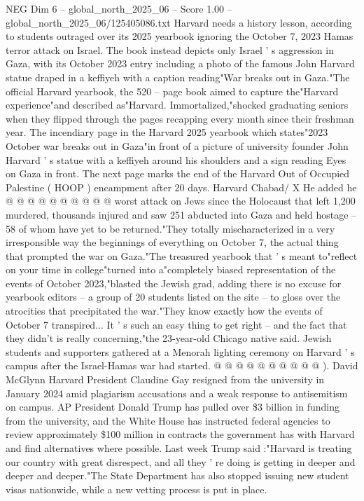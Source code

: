 \begin{textsample}{NEG Dim 6 – global\_north\_2025\_06 – Score 1.00 – global\_north\_2025\_06/125405086.txt}  \label{ex:f6_neg_424}
Harvard needs a history lesson, according to students outraged over its 2025 yearbook ignoring the October 7, 2023 Hamas terror attack on Israel.
The book instead depicts only Israel ' s aggression in Gaza, with its October 2023 entry including a photo of the famous John Harvard statue draped in a keffiyeh with a caption reading"War breaks out in Gaza."The official Harvard yearbook, the 520 -- page book aimed to capture the"Harvard experience"and described as"Harvard.
Immortalized,"shocked graduating seniors when they flipped through the pages recapping every month since their freshman year.
The incendiary page in the Harvard 2025 yearbook which states"2023 October war breaks out in Gaza"in front of a picture of university founder John Harvard ' s statue with a keffiyeh around his shoulders and a sign reading Eyes on Gaza in front.
The next page marks the end of the Harvard Out of Occupied Palestine ( HOOP ) encampment after 20 days.
Harvard Chabad/ X He added he @ @ @ @ @ @ @ @ @ @ worst attack on Jews since the Holocaust that left 1,200 murdered, thousands injured and saw 251 abducted into Gaza and held hostage -- 58 of whom have yet to be returned."They totally mischaracterized in a very irresponsible way the beginnings of everything on October 7, the actual thing that prompted the war on Gaza."The treasured yearbook that ' s meant to"reflect on your time in college"turned into a"completely biased representation of the events of October 2023,"blasted the Jewish grad, adding there is no excuse for yearbook editors -- a group of 20 students listed on the site -- to gloss over the atrocities that precipitated the war."They know exactly how the events of October 7 transpired...
It ' s such an easy thing to get right -- and the fact that they didn't is really concerning,"the 23-year-old Chicago native said.
Jewish students and supporters gathered at a Menorah lighting ceremony on Harvard ' s campus after the Israel-Hamas war had started. @ @ @ @ @ @ @ @ @ @ ).
David McGlynn Harvard President Claudine Gay resigned from the university in January 2024 amid plagiarism accusations and a weak response to antisemitism on campus.
AP President Donald Trump has pulled over \$3 billion in funding from the university, and the White House has instructed federal agencies to review approximately \$100 million in contracts the government has with Harvard and find alternatives where possible.
Last week Trump said :"Harvard is treating our country with great disrespect, and all they ' re doing is getting in deeper and deeper and deeper."The State Department has also stopped issuing new student visas nationwide, while a new vetting process is put in place.

\end{textsample}
